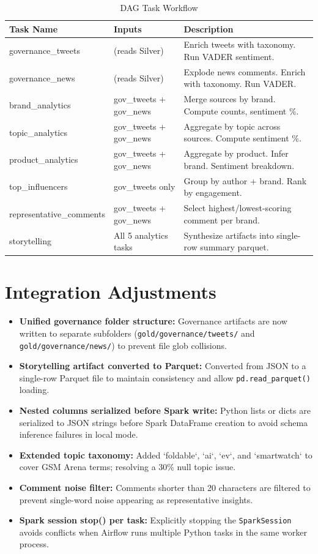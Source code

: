 \documentclass[12pt, a4paper]{article}
\begin{document}
\begin{table}[h]
\centering
\small
\renewcommand{\arraystretch}{1.3}
\begin{tabularx}{\textwidth}{l l X}
\toprule
\textbf{Task Name} & \textbf{Inputs} & \textbf{Description} \\
\midrule
governance\_tweets & (reads Silver) & Enrich tweets with taxonomy. Run VADER sentiment. \\
governance\_news & (reads Silver) & Explode news comments. Enrich with taxonomy. Run VADER. \\
brand\_analytics & gov\_tweets + gov\_news & Merge sources by brand. Compute counts, sentiment \%. \\
topic\_analytics & gov\_tweets + gov\_news & Aggregate by topic across sources. Compute sentiment \%. \\
product\_analytics & gov\_tweets + gov\_news & Aggregate by product. Infer brand. Sentiment breakdown. \\
top\_influencers & gov\_tweets only & Group by author + brand. Rank by engagement. \\
representative\_comments & gov\_tweets + gov\_news & Select highest/lowest-scoring comment per brand. \\
storytelling & All 5 analytics tasks & Synthesize artifacts into single-row summary parquet. \\
\bottomrule
\end{tabularx}
\caption{DAG Task Workflow}
\end{table}

\section{Integration Adjustments}
\begin{itemize}
    \item \textbf{Unified governance folder structure:} Governance artifacts are now written to separate subfolders (\texttt{gold/governance/tweets/} and \texttt{gold/governance/news/}) to prevent file glob collisions.
    \item \textbf{Storytelling artifact converted to Parquet:} Converted from JSON to a single-row Parquet file to maintain consistency and allow \texttt{pd.read\_parquet()} loading.
    \item \textbf{Nested columns serialized before Spark write:} Python lists or dicts are serialized to JSON strings before Spark DataFrame creation to avoid schema inference failures in local mode.
    \item \textbf{Extended topic taxonomy:} Added `foldable`, `ai`, `ev`, and `smartwatch` to cover GSM Arena terms; resolving a 30\% null topic issue.
    \item \textbf{Comment noise filter:} Comments shorter than 20 characters are filtered to prevent single-word noise appearing as representative insights.
    \item \textbf{Spark session stop() per task:} Explicitly stopping the \texttt{SparkSession} avoids conflicts when Airflow runs multiple Python tasks in the same worker process.
\end{itemize}
\end{document}
